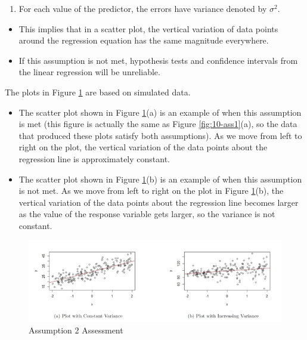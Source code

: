 \documentclass[
]{book}
\providecommand{\tightlist}{%
  \setlength{\itemsep}{0pt}\setlength{\parskip}{0pt}}
\begin{document}
\begin{enumerate}
\def\labelenumi{\arabic{enumi}.}
\setcounter{enumi}{1}
\tightlist
\item
  For each value of the predictor, the errors have variance denoted by \(\sigma^2\).
\end{enumerate}

\begin{itemize}
\tightlist
\item
  This implies that in a scatter plot, the vertical variation of data points around the regression equation has the same magnitude everywhere.
\item
  If this assumption is not met, hypothesis tests and confidence intervals from the linear regression will be unreliable.
\end{itemize}

The plots in Figure \ref{fig:10-ass2} are based on simulated data.

\begin{itemize}
\item
  The scatter plot shown in Figure \ref{fig:10-ass2}(a) is an example of when this assumption is met (this figure is actually the same as Figure \ref{fig:10-ass1}(a), so the data that produced these plots satisfy both assumptions). As we move from left to right on the plot, the vertical variation of the data points about the regression line is approximately constant.
\item
  The scatter plot shown in Figure \ref{fig:10-ass2}(b) is an example of when this assumption is not met. As we move from left to right on the plot in Figure \ref{fig:10-ass2}(b), the vertical variation of the data points about the regression line becomes larger as the value of the response variable gets larger, so the variance is not constant.
\end{itemize}

\begin{figure}
\centering
\includegraphics{images/10-ass2.jpg}
\caption{\label{fig:10-ass2}Assumption 2 Assessment}
\end{figure}
\end{document}
